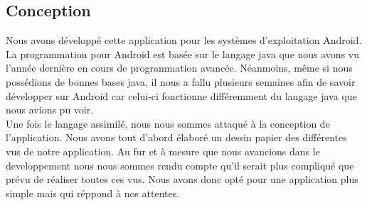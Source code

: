 \subsection{Conception}

Nous avons développé cette application pour les systèmes d'exploitation Android. La programmation pour Android est basée sur le langage java que nous avons vu l'année dernière en cours de programmation avancée. Néanmoins, même si nous possédions de bonnes bases java, il nous a fallu plusieurs semaines afin de savoir développer sur Android car celui-ci fonctionne différemment du langage java que nous avions pu voir. \\

Une fois le langage assimilé, nous nous sommes attaqué à la conception de l'application. Nous avons tout d'abord élaboré un dessin papier des différentes vus de notre application. Au fur et à mesure que nous avancions dans le developpement nous nous sommes rendu compte qu'il serait plus compliqué que prévu de réaliser toutes ces vus. Nous avons donc opté pour une application plus simple mais qui réppond à nos attentes.\\

